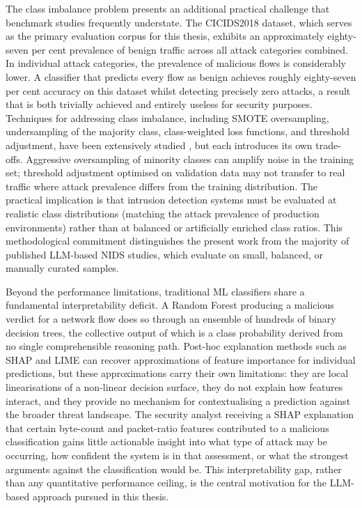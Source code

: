 The class imbalance problem presents an additional practical challenge that benchmark studies frequently understate. The CICIDS2018 dataset, which serves as the primary evaluation corpus for this thesis, exhibits an approximately eighty-seven per cent prevalence of benign traffic across all attack categories combined. In individual attack categories, the prevalence of malicious flows is considerably lower. A classifier that predicts every flow as benign achieves roughly eighty-seven per cent accuracy on this dataset whilst detecting precisely zero attacks, a result that is both trivially achieved and entirely useless for security purposes. Techniques for addressing class imbalance, including SMOTE oversampling, undersampling of the majority class, class-weighted loss functions, and threshold adjustment, have been extensively studied \autocite{Haixiang2017}, but each introduces its own trade-offs. Aggressive oversampling of minority classes can amplify noise in the training set; threshold adjustment optimised on validation data may not transfer to real traffic where attack prevalence differs from the training distribution. The practical implication is that intrusion detection systems must be evaluated at realistic class distributions (matching the attack prevalence of production environments) rather than at balanced or artificially enriched class ratios. This methodological commitment distinguishes the present work from the majority of published LLM-based NIDS studies, which evaluate on small, balanced, or manually curated samples.

Beyond the performance limitations, traditional ML classifiers share a fundamental interpretability deficit. A Random Forest producing a malicious verdict for a network flow does so through an ensemble of hundreds of binary decision trees, the collective output of which is a class probability derived from no single comprehensible reasoning path. Post-hoc explanation methods such as SHAP \autocite{Lundberg2017} and LIME \autocite{Ribeiro2016} can recover approximations of feature importance for individual predictions, but these approximations carry their own limitations: they are local linearisations of a non-linear decision surface, they do not explain how features interact, and they provide no mechanism for contextualising a prediction against the broader threat landscape. The security analyst receiving a SHAP explanation that certain byte-count and packet-ratio features contributed to a malicious classification gains little actionable insight into what type of attack may be occurring, how confident the system is in that assessment, or what the strongest arguments against the classification would be. This interpretability gap, rather than any quantitative performance ceiling, is the central motivation for the LLM-based approach pursued in this thesis.

